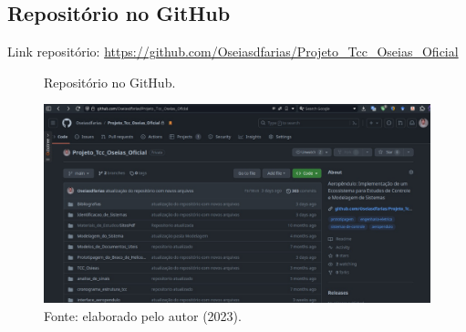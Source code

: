 
\begin{apendicesenv}
\partapendices

\chapter{Repositório no GitHub} %
\label{apendice_1}

Link repositório: \href{https://github.com/Oseiasdfarias/Projeto\_Tcc\_Oseias\_Oficial}{https://github.com/Oseiasdfarias/Projeto\_Tcc\_Oseias\_Oficial}

\begin{figure}[!h]
	\centering
	\caption{Repositório no GitHub.}
	\includegraphics[width=1.0\textwidth]{utils/repo_github.eps}
	\caption*{Fonte: elaborado pelo autor (2023).}
	\label{fig3:image_27}
\end{figure}


%

\end{apendicesenv}
